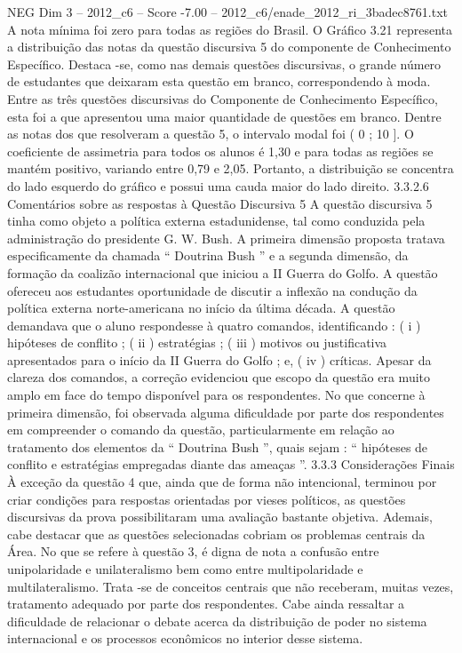 \begin{textsample}{NEG Dim 3 – 2012\_c6 – Score -7.00 – 2012\_c6/enade\_2012\_ri\_3badec8761.txt}
A nota mínima foi zero para todas as regiões do Brasil.
O Gráfico 3.21 representa a distribuição das notas da questão discursiva 5 do componente de Conhecimento Específico.
Destaca -se, como nas demais questões discursivas, o grande número de estudantes que deixaram esta questão em branco, correspondendo à moda.
Entre as três questões discursivas do Componente de Conhecimento Específico, esta foi a que apresentou uma maior quantidade de questões em branco.
Dentre as notas dos que resolveram a questão 5, o intervalo modal foi ( 0 ; 10 ].
O coeficiente de assimetria para todos os alunos é 1,30 e para todas as regiões se mantém positivo, variando entre 0,79 e 2,05.
Portanto, a distribuição se concentra do lado esquerdo do gráfico e possui uma cauda maior do lado direito. 3.3.2.6 Comentários sobre as respostas à Questão Discursiva 5 A questão discursiva 5 tinha como objeto a política externa estadunidense, tal como conduzida pela administração do presidente G.
W.
Bush.
A primeira dimensão proposta tratava especificamente da chamada “ Doutrina Bush ” e a segunda dimensão, da formação da coalizão internacional que iniciou a II Guerra do Golfo.
A questão ofereceu aos estudantes oportunidade de discutir a inflexão na condução da política externa norte-americana no início da última década.
A questão demandava que o aluno respondesse à quatro comandos, identificando : ( i ) hipóteses de conflito ; ( ii ) estratégias ; ( iii ) motivos ou justificativa apresentados para o início da II Guerra do Golfo ; e, ( iv ) críticas.
Apesar da clareza dos comandos, a correção evidenciou que escopo da questão era muito amplo em face do tempo disponível para os respondentes.
No que concerne à primeira dimensão, foi observada alguma dificuldade por parte dos respondentes em compreender o comando da questão, particularmente em relação ao tratamento dos elementos da “ Doutrina Bush ”, quais sejam : “ hipóteses de conflito e estratégias empregadas diante das ameaças ”. 3.3.3 Considerações Finais À exceção da questão 4 que, ainda que de forma não intencional, terminou por criar condições para respostas orientadas por vieses políticos, as questões discursivas da prova possibilitaram uma avaliação bastante objetiva.
Ademais, cabe destacar que as questões selecionadas cobriam os problemas centrais da Área.
No que se refere à questão 3, é digna de nota a confusão entre unipolaridade e unilateralismo bem como entre multipolaridade e multilateralismo.
Trata -se de conceitos centrais que não receberam, muitas vezes, tratamento adequado por parte dos respondentes.
Cabe ainda ressaltar a dificuldade de relacionar o debate acerca da distribuição de poder no sistema internacional e os processos econômicos no interior desse sistema.

\end{textsample}
